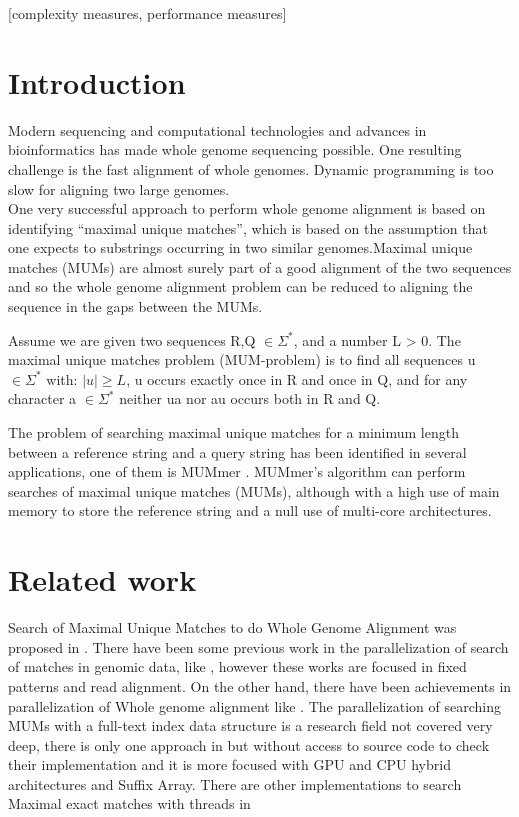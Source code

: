 \documentclass{acm_proc_article-sp}
\begin{document}
[complexity measures, performance measures]



\section{Introduction} 
Modern sequencing and computational technologies and advances in bioinformatics has made whole genome sequencing possible. One resulting challenge is the fast alignment of whole genomes. Dynamic programming is too slow for aligning two large genomes.\\
One very successful approach to perform whole genome alignment is based on identifying ``maximal unique matches'', which is based on the assumption that one expects to substrings occurring in two similar genomes.Maximal unique matches (MUMs) are almost surely part of a good alignment of the two sequences and so the whole genome alignment problem can be reduced to aligning the sequence in the gaps between the MUMs.
\begin{definition}
Assume we are given two sequences R,Q $\in \Sigma^*$, and a number L > 0. The maximal unique matches problem (MUM-problem) is to find all sequences u $\in \Sigma^*$ with: $|u|\geq L$, u occurs exactly once in R and once in Q, and for any character a $\in \Sigma^*$ neither ua nor au occurs both in R and Q.
\end{definition}
The problem of searching maximal unique matches for a minimum length between a reference string and a query string has been
identified in several applications, one of them is MUMmer \cite{Delcher2003}. MUMmer's algorithm can perform searches of maximal unique matches (MUMs), although
with a high use of main memory to store the reference string and a null use of multi-core architectures.

\section{Related work}
Search of Maximal Unique Matches to do Whole Genome Alignment was proposed in \cite{Delcher1999}. There have been some previous work in the parallelization of search of matches in genomic data, like \cite{OguzhanKulekci2011,Mongelli,Kouzinopoulos2005}, however these works are focused in fixed patterns and read alignment. On the other hand, there have been achievements in parallelization of Whole genome alignment like \cite{Meng2005}. The parallelization of searching MUMs with a full-text index data structure is a research field not covered very deep, there is only one approach in \cite{Encarnac2011} but without access to source code to check their implementation and it is more focused with GPU and CPU hybrid architectures and Suffix Array. There are other implementations to search Maximal exact matches with threads in \cite{Vyverman2013,OguzhanKulekci2011,Khan2009,OhlebuschGK10}
\end{document}
